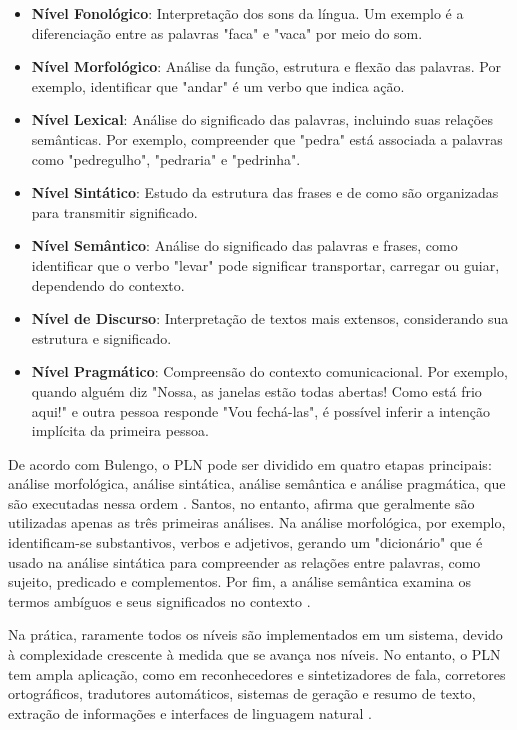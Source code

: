\begin{itemize}
    \item \textbf{Nível Fonológico}: Interpretação dos sons da língua. Um exemplo é a diferenciação entre as palavras "faca" e "vaca" por meio do som.
    \item \textbf{Nível Morfológico}: Análise da função, estrutura e flexão das palavras. Por exemplo, identificar que "andar" é um verbo que indica ação.
    \item \textbf{Nível Lexical}: Análise do significado das palavras, incluindo suas relações semânticas. Por exemplo, compreender que "pedra" está associada a palavras como "pedregulho", "pedraria" e "pedrinha".
    \item \textbf{Nível Sintático}: Estudo da estrutura das frases e de como são organizadas para transmitir significado.
    \item \textbf{Nível Semântico}: Análise do significado das palavras e frases, como identificar que o verbo "levar" pode significar transportar, carregar ou guiar, dependendo do contexto.
    \item \textbf{Nível de Discurso}: Interpretação de textos mais extensos, considerando sua estrutura e significado.
    \item \textbf{Nível Pragmático}: Compreensão do contexto comunicacional. Por exemplo, quando alguém diz "Nossa, as janelas estão todas abertas! Como está frio aqui!" e outra pessoa responde "Vou fechá-las", é possível inferir a intenção implícita da primeira pessoa.
\end{itemize}

De acordo com Bulengo, o PLN pode ser dividido em quatro etapas principais: análise morfológica, análise sintática, análise semântica e análise pragmática, que são executadas nessa ordem \cite{bulegon2010}. Santos, no entanto, afirma que geralmente são utilizadas apenas as três primeiras análises. Na análise morfológica, por exemplo, identificam-se substantivos, verbos e adjetivos, gerando um "dicionário" que é usado na análise sintática para compreender as relações entre palavras, como sujeito, predicado e complementos. Por fim, a análise semântica examina os termos ambíguos e seus significados no contexto \cite{santos2015}.

Na prática, raramente todos os níveis são implementados em um sistema, devido à complexidade crescente à medida que se avança nos níveis. No entanto, o PLN tem ampla aplicação, como em reconhecedores e sintetizadores de fala, corretores ortográficos, tradutores automáticos, sistemas de geração e resumo de texto, extração de informações e interfaces de linguagem natural \cite{vieira2001}.

